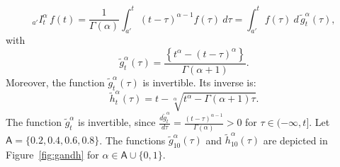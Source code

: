 \documentclass[twoside,reqno,11pt]{fcaa-var} %
\begin{document}
\begin{equation}
\label{eq:rl_to_rs}
_{a'}I_t^{\alpha}\,f(t) = \frac{1}{\Gamma(\alpha)}\int_{a'}^{t}(t-\tau)^{\alpha-1}f(\tau)~d\tau = \int_{a'}^{t} f(\tau)~d\,\widetilde{g}_t^{\alpha}(\tau), 
\end{equation}
with 
\begin{equation}
\label{eq:g_rl}
\widetilde{g}_t^{\alpha}(\tau) = \frac{\left \{t^{\alpha} - (t-\tau)^{\alpha} \right \}}{\Gamma(\alpha+1)}. 
\end{equation}
Moreover, the function $\widetilde{g}_t^{\alpha}(\tau)$ is invertible. Its inverse is:
\begin{equation}
\label{eq:h}
\widetilde{h}_t^{\alpha}(\tau) = t - \sqrt[\alpha]{t^{\alpha} - \Gamma(\alpha+1)\tau}.
\end{equation}
The function $\widetilde{g}_t^{\alpha}$ is invertible, since $\frac{d \widetilde{g}_t^{\alpha}}{d\tau}=\frac{(t-\tau)^{\alpha-1}}{\Gamma(\alpha)} > 0$ for $\tau\in(-\infty,t]$. Let $\mathsf{A} = \{0.2,0.4,0.6,0.8\}$. The functions $\widetilde{g}_{10}^{\alpha}(\tau)$ and $\widetilde{h}_{10}^{\alpha}(\tau)$ are depicted in Figure~\ref{fig:gandh} for $\alpha\in\mathsf{A}\cup\{0,1\}$.\\




\end{document}
